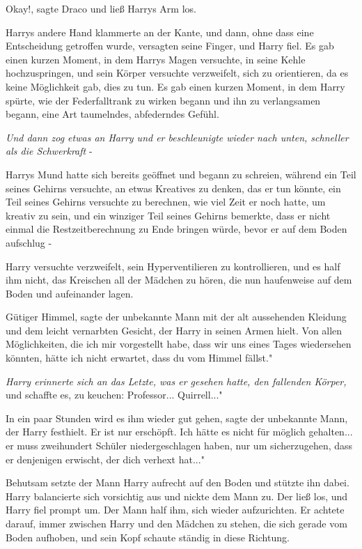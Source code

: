 \glqq{}Okay!\grqq{}, sagte Draco und ließ Harrys Arm los.

Harrys andere Hand klammerte an der Kante, und dann, ohne dass eine Entscheidung
getroffen wurde, versagten seine Finger, und Harry fiel. Es gab einen kurzen
Moment, in dem Harrys Magen versuchte, in seine Kehle hochzuspringen, und sein
Körper versuchte verzweifelt, sich zu orientieren, da es keine Möglichkeit gab,
dies zu tun. Es gab einen kurzen Moment, in dem Harry spürte, wie der
Federfalltrank zu wirken begann und ihn zu verlangsamen begann, eine Art
taumelndes, abfederndes Gefühl.

\emph{Und dann zog etwas an Harry und er beschleunigte wieder nach unten,
schneller als die Schwerkraft} -

Harrys Mund hatte sich bereits geöffnet und begann zu schreien, während ein Teil
seines Gehirns versuchte, an etwas Kreatives zu denken, das er tun könnte, ein
Teil seines Gehirns versuchte zu berechnen, wie viel Zeit er noch hatte, um
kreativ zu sein, und ein winziger Teil seines Gehirns bemerkte, dass er nicht
einmal die Restzeitberechnung zu Ende bringen würde, bevor er auf dem Boden
aufschlug -

Harry versuchte verzweifelt, sein Hyperventilieren zu kontrollieren, und es half
ihm nicht, das Kreischen all der Mädchen zu hören, die nun haufenweise auf dem
Boden und aufeinander lagen.

\glqq{}Gütiger Himmel\grqq{}, sagte der unbekannte Mann mit der alt aussehenden
Kleidung und dem leicht vernarbten Gesicht, der Harry in seinen Armen hielt.
\glqq{}Von allen Möglichkeiten, die ich mir vorgestellt habe, dass wir uns eines
Tages wiedersehen könnten, hätte ich nicht erwartet, dass du vom Himmel fällst."

\emph{Harry erinnerte sich an das Letzte, was er gesehen hatte, den fallenden
Körper,} und schaffte es, zu keuchen: \glqq{}Professor... Quirrell..."

\glqq{}In ein paar Stunden wird es ihm wieder gut gehen\grqq{}, sagte der
unbekannte Mann, der Harry festhielt. \glqq{}Er ist nur erschöpft. Ich hätte es
nicht für möglich gehalten... er muss zweihundert Schüler niedergeschlagen
haben, nur um sicherzugehen, dass er denjenigen erwischt, der dich verhext
hat..."

Behutsam setzte der Mann Harry aufrecht auf den Boden und stützte ihn dabei.
Harry balancierte sich vorsichtig aus und nickte dem Mann zu. Der ließ los, und
Harry fiel prompt um. Der Mann half ihm, sich wieder aufzurichten. Er achtete
darauf, immer zwischen Harry und den Mädchen zu stehen, die sich gerade vom
Boden aufhoben, und sein Kopf schaute ständig in diese Richtung.

